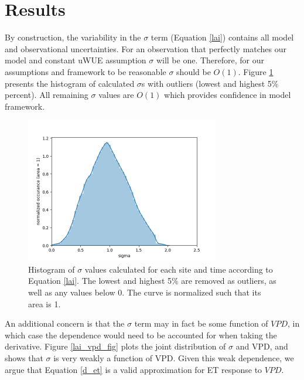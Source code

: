 \documentclass[draft,linenumbers]{agujournal}
\begin{document}
\section{Results}
\label{results}

By construction, the variability in the $\sigma$ term (Equation \ref{lai}) contains all model and observational uncertainties. For an observation that perfectly matches our model and constant uWUE assumption $\sigma$ will be one. Therefore, for our assumptions and framework to be reasonable $\sigma$ should be $O(1)$. Figure \ref{lai_fig} presents the histogram of calculated $\sigma$s with outliers (lowest and highest 5\% percent). All remaining $\sigma$ values are $O(1)$ which provides confidence in model framework.

\begin{figure}[h]
\centering
\includegraphics[width=20pc]{./fig02.png}
\caption{Histogram of $\sigma$ values calculated for each site and time according to Equation \ref{lai}. The lowest and highest 5\% are removed as outliers, as well as any values below 0. The curve is normalized such that its area is 1. }
\label{lai_fig}
\end{figure}

An additional concern is that the $\sigma$ term may in fact be some function of $VPD$, in which case the dependence would need to be accounted for when taking the derivative. Figure \ref{lai_vpd_fig} plots the joint distribution of $\sigma$ and VPD, and shows that $\sigma$ is very weakly a function of VPD. Given this weak dependence, we argue that Equation \ref{d_et} is a valid approximation for ET response to $VPD$.
\end{document}

